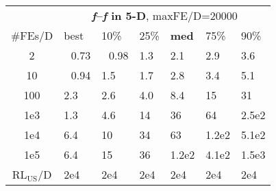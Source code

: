 \begin{tabular}{c|llllll}
 & \multicolumn{6}{|c}{\textbf{\textit{f}\raisebox{-0.35ex}{1}--\textit{f}\raisebox{-0.35ex}{24} in 5-D}, maxFE/D=20000}\\
\#FEs/D & best & 10\% & 25\% & \textbf{med} & 75\% & 90\%\\
2 & ~\,0.73 & ~\,0.98 & \hspace*{1ex}1.3 & \hspace*{1ex}2.1 & \hspace*{1ex}2.9 & \hspace*{1ex}3.6\\
10 & ~\,0.94 & \hspace*{1ex}1.5 & \hspace*{1ex}1.7 & \hspace*{1ex}2.8 & \hspace*{1ex}3.4 & \hspace*{1ex}5.1\\
100 & \hspace*{1ex}2.3 & \hspace*{1ex}2.6 & \hspace*{1ex}4.0 & \hspace*{1ex}8.4 & 15 & 31\\
1e3 & \hspace*{1ex}1.3 & \hspace*{1ex}4.6 & 14 & 36 & 64 & 2.5e2\\
1e4 & \hspace*{1ex}6.4 & 10 & 34 & 63 & 1.2e2 & 5.1e2\\
1e5 & \hspace*{1ex}6.4 & 15 & 36 & 1.2e2 & 4.1e2 & 1.5e3\\
$\text{RL}_{\text{US}}$/D & 2e4 & 2e4 & 2e4 & 2e4 & 2e4 & 2e4
\end{tabular}
